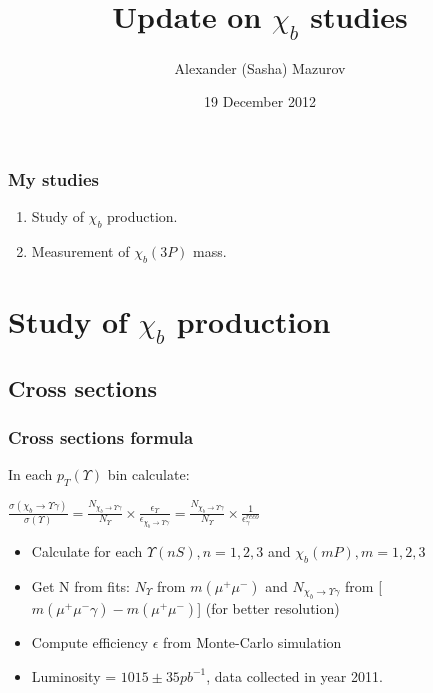 \documentclass{beamer}
\title{Update on $\chi_b$ studies}
\institute[University of Ferrara]{
  University of Ferrara, Italy\\
  \&\\
  CERN\\
  \texttt{alexander.mazurov@cern.ch}
}
\author[Sasha Mazurov]{Alexander (Sasha) Mazurov}
\date{19 December 2012}
\begin{document}
\maketitle
\begin{frame}
\frametitle{My studies}
\begin{enumerate}
    \item Study of $\chi_{b}$ production.
    \item Measurement of $\chi_{b}(3P)$ mass.
\end{enumerate}
\end{frame}
\section{Study of $\chi_{b}$ production}
\subsection{Cross sections}
\begin{frame}
\frametitle{Cross sections formula}
In each $p_T(\Upsilon)$ bin calculate:
\begin{center}
$\frac{\sigma(\chi_{b} \rightarrow \Upsilon \gamma)}{\sigma(\Upsilon)} = \frac{N_{\chi_b \rightarrow \Upsilon \gamma}}{N_{\Upsilon}} \times \frac{\epsilon_{\Upsilon}}{\epsilon_{\chi_b \rightarrow \Upsilon \gamma}} = \frac{N_{\chi_b \rightarrow \Upsilon \gamma}}{N_{\Upsilon}} \times \frac{1}{\epsilon_{\gamma}^{reco}}$
\end{center}
\begin{itemize}
  \item Calculate for each $\Upsilon(nS), n=1,2,3$ and $\chi_b(mP), m=1,2,3$
  \item Get N from fits: $N_{\Upsilon}$ from  $m(\mu^+ \mu^-)$ and $N_{\chi_b \rightarrow \Upsilon \gamma}$ from [$m(\mu^+ \mu^- \gamma) - m(\mu^+ \mu^-)$] (for better resolution)
  \item Compute efficiency $\epsilon$  from Monte-Carlo simulation
  \item Luminosity = $1015 \pm 35 pb^{-1}$, data collected in year 2011.
\end{itemize}
\end{frame}
\end{document}

